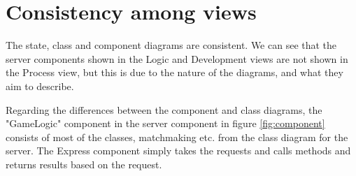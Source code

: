 \section{Consistency among views}
The state, class and component diagrams are consistent. We can see that the server components shown in the Logic and Development views are not shown in the Process view, but this is due to the nature of the diagrams, and what they aim to describe.

Regarding the differences between the component and class diagrams, the "GameLogic" component in the server component in figure \ref{fig:component} consists of most of the classes, matchmaking etc. from the class diagram for the server. The Express component simply takes the requests and calls methods and returns results based on the request. 